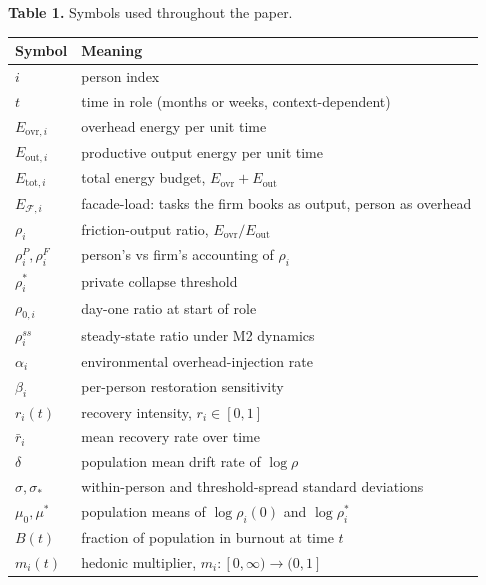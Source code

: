 \documentclass[11pt]{article}
\begin{document}
\begin{center}
\textbf{Table 1.} Symbols used throughout the paper.

\medskip
\begin{tabular}{ll}
\toprule
Symbol & Meaning \\
\midrule
$i$                            & person index \\
$t$                            & time in role (months or weeks, context-dependent) \\
$E_{\text{ovr},i}$             & overhead energy per unit time \\
$E_{\text{out},i}$             & productive output energy per unit time \\
$E_{\text{tot},i}$             & total energy budget, $E_{\text{ovr}} + E_{\text{out}}$ \\
$E_{\mathcal{F},i}$            & facade-load: tasks the firm books as output, person as overhead \\
$\rho_i$                       & friction-output ratio, $E_{\text{ovr}}/E_{\text{out}}$ \\
$\rho_i^P, \rho_i^F$           & person's vs firm's accounting of $\rho_i$ \\
$\rho_i^*$                     & private collapse threshold \\
$\rho_{0,i}$                   & day-one ratio at start of role \\
$\rho_i^{ss}$                  & steady-state ratio under M2 dynamics \\
$\alpha_i$                     & environmental overhead-injection rate \\
$\beta_i$                      & per-person restoration sensitivity \\
$r_i(t)$                       & recovery intensity, $r_i \in [0,1]$ \\
$\bar r_i$                     & mean recovery rate over time \\
$\delta$                       & population mean drift rate of $\log \rho$ \\
$\sigma, \sigma_*$             & within-person and threshold-spread standard deviations \\
$\mu_0, \mu^*$                 & population means of $\log \rho_i(0)$ and $\log \rho_i^*$ \\
$B(t)$                         & fraction of population in burnout at time $t$ \\
$m_i(t)$                       & hedonic multiplier, $m_i: [0,\infty) \to (0, 1]$ \\

\end{tabular}
\end{center}
\end{document}
